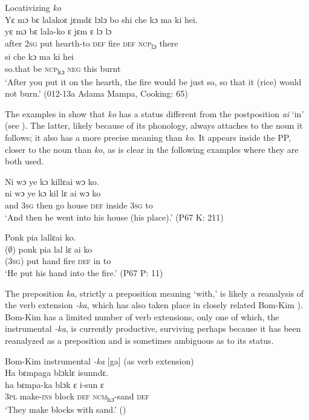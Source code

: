 \ea %
\label{ex:82}
Locativizing \textit{ko}\\
Yɛ mɔ bɛ lalakoɛ jɛmdɛ lɔlɔ bo shi che kɔ ma ki hei.\\
\gll yɛ    mɔ  bɛ    lala-ko    ɛ    jɛm  ɛ    lɔ    lɔ\\
after  \textsc{2sg}  put  hearth-to  \textsc{def}  fire  \textsc{def}  \textsc{ncp}\textsubscript{lɔ}  there\\
\gll si      che  kɔ      ma  ki    hei\\
so.that  be    \textsc{ncp}\textsubscript{kɔ}    \textsc{neg}  this  burnt\\
\glt ‘After you put it on the hearth, the fire would be just so, so that it (rice) would not burn.' (012-13a Adama Mampa, Cooking: 65)
\z

The examples in  show that \textit{ko} has a status different from the postposition \textit{ai} ‘in' (see ). The latter, likely because of its phonology, always attaches to the noun it follows; it also has a more precise meaning than \textit{ko}. It appears inside the PP, closer to the noun than \textit{ko}, as is clear in the following examples where they are both used.

\ea%
    \label{ex:83}
    \ea Ni wɔ ye kɔ killɛai wɔ ko.\\
    \gll ni    wɔ    ye    kɔ    kil      lɛ    ai      wɔ    ko\\
    and  \textsc{3sg}  then  go    house    \textsc{def}  inside    \textsc{3sg}  to\\
    \glt ‘And then he went into his house (his place).' (P67 K: 211)

    \ex Ponk pia lallɛai ko.\\
  \gll ($\emptyset$) ponk  pia  lal    lɛ    ai    ko\\
(\textsc{3sg})  put  hand  fire  \textsc{def}  in    to\\
\glt ‘He put his hand into the fire.' (P67 P: 11)
\z
\z

The preposition \textit{ka}, strictly a preposition meaning ‘with,' is likely a reanalysis of the verb extension \textit{{}-ka}, which has also taken place in closely related Bom-Kim {\citealt{Childs2020}}). Bom-Kim has a limited number of verb extensions, only one of which, the instrumental \textit{\nobreakdash-ka}, is currently productive, surviving perhaps because it has been reanalyzed as a preposition and is sometimes ambiguous as to its status.

\ea%
    \label{ex:84}
    Bom-Kim instrumental \textit{{}-ka} [ga] (as verb extension)\\
    \vspace{6pt}  
    Ha bɛmpaga blɔklɛ isunndɛ.\\
    \gll ha    bɛmpa-ka    blɔk    ɛ    i-sun        ɛ\\
    3\textsc{pl}  make-\textsc{ins}    block    \textsc{def}  \textsc{ncm}\textsubscript{hɔ}{}-sand    \textsc{def}\\
    \glt ‘They make blocks with sand.' (\citealt{Childs2020})
  \z

